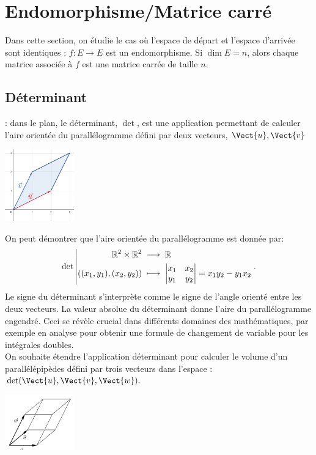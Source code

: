 \documentclass{book}
\begin{document}
\section{Endomorphisme/Matrice carré}
Dans cette section, on étudie le cas où l'espace de départ et l'espace d'arrivée sont identiques : $f : E\to E$ est un
endomorphisme. Si $\dim E = n$, alors chaque matrice associée à $f$ est une matrice carrée de taille $n$.
\subsection{Déterminant}
 : dans le plan, le déterminant, $\det$, est une application permettant de calculer l'aire orientée du parallélogramme défini par deux vecteurs, $\Vect{u},\Vect{v}$  
\begin{center}
\includegraphics[width=3cm]{determinant.png}
\end{center}
On peut démontrer que l'aire orientée du parallélogramme est donnée par:  
$$
{\mathop{\mathrm{det}}\nolimits}\left|\begin{aligned}{\mathbb{R}^2\times\mathbb{R}^2}&\;\longrightarrow\;{\mathbb{R}}\\{((x_1,y_1),(x_2,y_2))}&\;\longmapsto\;{\begin{vmatrix}
x_1 & x_2 \\
y_1 & y_2
\end{vmatrix}=x_1y_2-y_1x_2}\end{aligned}\right..
$$
Le signe du déterminant s'interprète comme le signe de l'angle orienté entre les deux vecteurs. La valeur absolue du déterminant donne l'aire du parallélogramme engendré. Ceci se révèle crucial dans
différents domaines des mathématiques, par exemple en analyse pour obtenir une formule de changement de variable pour les intégrales doubles.\\
On souhaite étendre l'application déterminant pour calculer le volume d'un parallélépipèdes défini par trois vecteurs dans l'espace : $\det(\Vect{u},\Vect{v},\Vect{w}).$
\begin{center}
\includegraphics[width=3cm]{determinant3.png}
\end{center}
\end{document}
